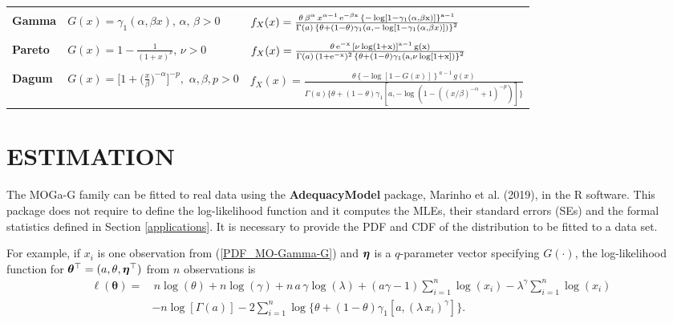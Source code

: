 \documentclass[twoside,leqno,11pt]{article}
\newcommand{\etn}{{\mbox{\boldmath $\eta$}}}
\begin{document}
\begin{landscape}
\begin{table}[htbp]
{\begin{tabular}{l|l|l}
			{} & {} & {} \\
			\hline
			{} & {} & {} \\
			\textbf{Gamma} &  $G(x)=\gamma_1(\alpha,\beta x),\,\alpha,\,\beta>0$ & $f_{X}(x)=\frac{\theta\,\beta^{\alpha}\,x^{\alpha-1}\,\rm{e}^{-\beta x}\,\left\{ -\log[1-\gamma_1(\alpha,\beta x)] \right\}^{a-1}}{\Gamma(a)\,\left\{\theta+(1-\theta)\gamma_1\left( a, -\log \left[1-\gamma_1(\alpha,\beta x)\right]\right)\right\}^{2}}$ \\
			{} & {} & {} \\                                                                                                                                                                          \hline
			\textbf{Pareto} &  $G(x)=1-\frac{1}{(1+x)^\nu},\,\nu>0$ & $f_{X}(x)=\frac{\theta \, \rm{e}^{-x}\, \left[\nu\log(1+x)\right]^{a-1}\, g(x)}{\Gamma(a)\,(1+\rm{e}^{-x})^2\,\left\{\theta+(1-\theta)\gamma_1\left( a, \nu\log[1+x]\right)\right\}^{2}}$\\
			{} & {} & {} \\
			\hline
			\textbf{Dagum} & $G(x) = \Big[1 + \Big(\frac{x}{\beta}\Big) ^ {-\alpha}\Big] ^ {-p},\,\, \alpha, \beta, p > 0$ & $f_X(x) = \frac{\theta  \left\{ -\log[1-G(x)] \right\}^{a-1}\, g(x)}{\Gamma(a)\{\theta + (1 - \theta)\gamma_1[a, -\log   (1-((x/\beta)^{-\alpha}+1)^{-p})]\}}$ \\
			\hline
		\end{tabular} }
	\end{table}
\end{landscape}

\section{ESTIMATION}\label{estimation}

The  MOGa-G family can be  fitted to real data using the {\bf AdequacyModel} package, {\color{red}Marinho et al. (2019)}, in the {\sf R} software.
This packa\-ge does not require to define the log-likelihood function and it computes the MLEs, their standard errors (SEs)
and the formal statistics defined in Section \ref{applications}. It is necessary to provide the
PDF and CDF of the distribution to be fitted to a data set.

For example, if $x_i$ is one observation from (\ref{PDF_MO-Gamma-G}) and $\etn$ is a $q$-parameter vector specifying $G(\cdot)$,
the log-likelihood function for $\boldsymbol{\theta}^\top=(a,\theta,\etn^\top)$ from $n$ observations is
\begin{align}\label{loglik}
\ell (\boldsymbol{\theta})=&\,n\log (\theta)+n\log(\gamma)+n\, a\, \gamma \log(\lambda)+(a\gamma-1)\sum_{i=1}^n{\log(x_i)}-\lambda^\gamma\sum_{i=1}^n{\log(x_i)}\nonumber \\ &
-n\log[\Gamma(a)]-2\sum_{i=1}^n{\log\{\theta+(1-\theta)\gamma_1[a,(\lambda\,x_i)^\gamma]\}}.
\end{align}
\end{document}
